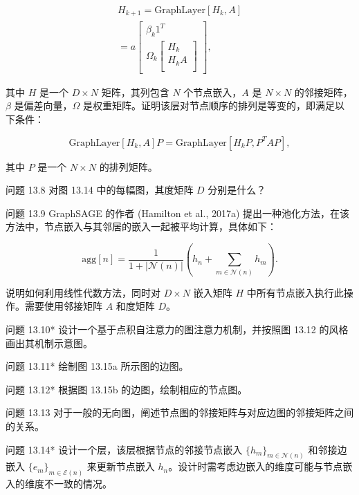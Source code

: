 \begin{align}
H_{k+1} = \text{GraphLayer}[H_k, A] \\
= a \left[
\begin{array}{c}
\beta_k 1^T \\
\Omega_k \left[ \begin{array}{c}
H_k \\
H_k A \\
\end{array} \right]
\end{array}
\right], \tag{13.28}
\end{align} 


其中 \(H\) 是一个 \(D \times N\) 矩阵，其列包含 \(N\) 个节点嵌入，\(A\) 是 \(N \times N\) 的邻接矩阵，\(\beta\) 是偏差向量，\(\Omega\) 是权重矩阵。证明该层对节点顺序的排列是等变的，即满足以下条件：

\[
\text{GraphLayer}[H_k, A]P = \text{GraphLayer}[H_k P, P^T AP], \tag{13.29}
\]

其中 \(P\) 是一个 \(N \times N\) 的排列矩阵。

问题 13.8 对图 13.14 中的每幅图，其度矩阵 \(D\) 分别是什么？

问题 13.9 GraphSAGE 的作者 (Hamilton et al., 2017a) 提出一种池化方法，在该方法中，节点嵌入与其邻居的嵌入一起被平均计算，具体如下：

\[
\text{agg}[n] = \frac{1}{1 + |\mathcal{N}(n)|} \left( h_n + \sum_{m \in \mathcal{N}(n)} h_m \right). \tag{13.30}
\]

说明如何利用线性代数方法，同时对 \(D \times N\) 嵌入矩阵 \(H\) 中所有节点嵌入执行此操作。需要使用邻接矩阵 \(A\) 和度矩阵 \(D\)。

问题 13.10* 设计一个基于点积自注意力的图注意力机制，并按照图 13.12 的风格画出其机制示意图。

问题 13.11* 绘制图 13.15a 所示图的边图。

问题 13.12* 根据图 13.15b 的边图，绘制相应的节点图。

问题 13.13 对于一般的无向图，阐述节点图的邻接矩阵与对应边图的邻接矩阵之间的关系。

问题 13.14* 设计一个层，该层根据节点的邻接节点嵌入 \(\{h_m\}_{m\in\mathcal{N}(n)}\) 和邻接边嵌入 \(\{e_m\}_{m\in\mathcal{E}(n)}\) 来更新节点嵌入 \(h_n\)。设计时需考虑边嵌入的维度可能与节点嵌入的维度不一致的情况。


